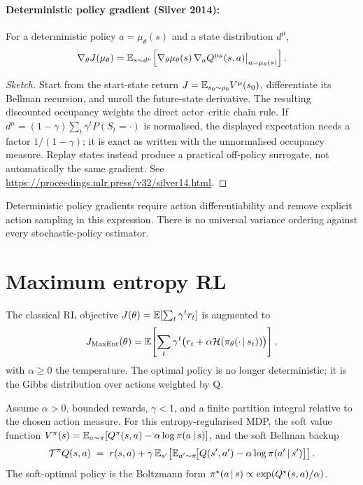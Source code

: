 \documentclass[11pt,oneside]{scrbook}
\begin{document}
\paragraph{Deterministic policy gradient (Silver 2014):}
\begin{theorem}[DPG]
\label{thm:dpg}
For a deterministic policy $a = \mu_\theta(s)$ and a state distribution $d^\mu$,
\[
  \nabla_\theta J(\mu_\theta) = \mathbb{E}_{s \sim d^\mu}\!\left[\nabla_\theta \mu_\theta(s)\, \nabla_a Q^{\mu_\theta}(s, a)\big|_{a=\mu_\theta(s)}\right].
\]
\end{theorem}

\begin{proof}[Sketch]
Start from the start-state return $J=\mathbb{E}_{s_0\sim\rho_0}V^\mu(s_0)$,
differentiate its Bellman recursion, and unroll the future-state derivative.
The resulting discounted occupancy weights the direct actor--critic chain
rule. If $d^\mu=(1-\gamma)\sum_t\gamma^t P(S_t=\cdot)$ is normalised,
the displayed expectation needs a factor $1/(1-\gamma)$; it is exact as
written with the unnormalised occupancy measure. Replay states instead
produce a practical off-policy surrogate, not automatically the same gradient.
See \url{https://proceedings.mlr.press/v32/silver14.html}.
\end{proof}
Deterministic policy gradients require action differentiability and remove
explicit action sampling in this expression. There is no universal variance
ordering against every stochastic-policy estimator.

\section{Maximum entropy RL}

The classical RL objective $J(\theta) = \mathbb{E}[\sum_t \gamma^t r_t]$ is augmented to
\[
  J_\text{MaxEnt}(\theta) = \mathbb{E}\!\left[\sum_t \gamma^t \big(r_t + \alpha \mathcal{H}(\pi_\theta(\cdot\,\vert\, s_t))\big)\right],
\]
with $\alpha \ge 0$ the temperature. The optimal policy is no longer deterministic; it is the Gibbs distribution over actions weighted by Q.

\begin{theorem}
\label{thm:soft}
Assume $\alpha>0$, bounded rewards, $\gamma<1$, and a finite
partition integral relative to the chosen action measure. For this
entropy-regularised MDP, the soft value function $V^\pi(s) = \mathbb{E}_{a\sim\pi}[Q^\pi(s,a) - \alpha \log \pi(a\,\vert\, s)]$, and the soft Bellman backup
\[
  \mathcal{T}^\pi Q(s, a) \;=\; r(s, a) + \gamma\, \mathbb{E}_{s'}\!\left[\mathbb{E}_{a'\sim\pi}\!\big[Q(s', a') - \alpha \log \pi(a'\,\vert\, s')\big]\right].
\]
The soft-optimal policy is the Boltzmann form $\pi^\star(a\,\vert\, s) \propto \exp(Q^\star(s,a)/\alpha)$.
\end{theorem}
\end{document}
